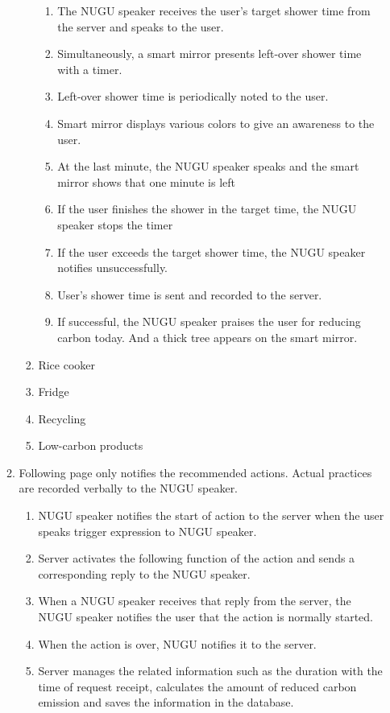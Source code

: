 \documentclass[11pt, conference]{IEEEtran}
\begin{document}
\begin{enumerate}[label=\arabic*]
\begin{enumerate}[label=\alph*]
\begin{enumerate}
\begin{enumerate}[label=\arabic*]
                \item The NUGU speaker receives the user’s target shower time from the server and speaks to the user.
                \item Simultaneously, a smart mirror presents left-over shower time with a timer.
                \item Left-over shower time is periodically noted to the user.
                \item Smart mirror displays various colors to give an awareness to the user.
                \item At the last minute, the NUGU speaker speaks and the smart mirror shows that one minute is left
                \item If the user finishes the shower in the target time, the NUGU speaker stops the timer 
                \item If the user exceeds the target shower time, the NUGU speaker notifies unsuccessfully.
                \item User’s shower time is sent and recorded to the server.
                \item If successful, the NUGU speaker praises the user for reducing carbon today. And a thick tree appears on the smart mirror.
            \end{enumerate}
            \item Rice cooker
            \item Fridge
            \item Recycling
            \item Low-carbon products
        \end{enumerate}
        \item Following page only notifies the recommended actions. Actual practices are recorded verbally to the NUGU speaker.
        \begin{enumerate}
            \item NUGU speaker notifies the start of action to the server when the user speaks trigger expression to NUGU speaker.
            \item Server activates the following function of the action and sends a corresponding reply to the NUGU speaker.
            \item When a NUGU speaker receives that reply from the server, the NUGU speaker notifies the user that the action is normally started. 
            \item When the action is over, NUGU notifies it to the server.
            \item Server manages the related information such as the duration with the time of request receipt, calculates the amount of reduced carbon emission and saves the information in the database.\\
        \end{enumerate}
    \end{enumerate}
    

\end{enumerate}
\end{document}
